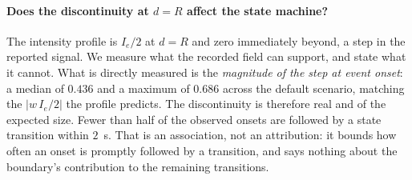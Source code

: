 \paragraph*{Does the discontinuity at $d=R$ affect the state machine?}
The intensity profile is $I_e/2$ at $d=R$ and zero immediately beyond, a step in the
reported signal. %
We measure what the recorded field can support, and state what it cannot. What is
directly measured is the \emph{magnitude of the step at event onset}: a median of
$0.436$ and a maximum of $0.686$ across the default scenario, matching the
$|w\,I_e/2|$ the profile predicts. The discontinuity is therefore real and of the
expected size. Fewer than half of the observed onsets are followed by a state
transition within $2$~s. That is an association, not an attribution: it bounds how
often an onset is promptly followed by a transition, and says nothing about the
boundary's contribution to the remaining transitions.

